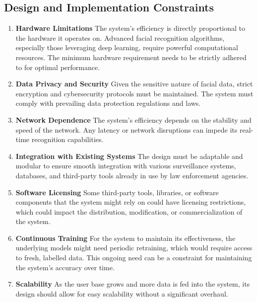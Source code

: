     \subsection{Design and Implementation Constraints}
        \begin{enumerate}
            \item \textbf{Hardware Limitations}
            The system's efficiency is directly proportional to the hardware it operates on. Advanced facial recognition algorithms, especially those leveraging deep learning, require powerful computational resources. The minimum hardware requirement needs to be strictly adhered to for optimal performance.
            \item \textbf{Data Privacy and Security}
            Given the sensitive nature of facial data, strict encryption and cybersecurity protocols must be maintained. The system must comply with prevailing data protection regulations and laws.
            \item \textbf{Network Dependence}
            The system's efficiency depends on the stability and speed of the network. Any latency or network disruptions can impede its real-time recognition capabilities.
            \item \textbf{Integration with Existing Systems}
            The design must be adaptable and modular to ensure smooth integration with various surveillance systems, databases, and third-party tools already in use by law enforcement agencies.
            \item \textbf{Software Licensing}
            Some third-party tools, libraries, or software components that the system might rely on could have licensing restrictions, which could impact the distribution, modification, or commercialization of the system.
            \item \textbf{Continuous Training}
            For the system to maintain its effectiveness, the underlying models might need periodic retraining, which would require access to fresh, labelled data. This ongoing need can be a constraint for maintaining the system's accuracy over time.
            \item  \textbf{Scalability}
            As the user base grows and more data is fed into the system, its design should allow for easy scalability without a significant overhaul.
        \end{enumerate}
    
